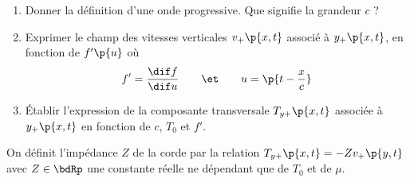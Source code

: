 \documentclass[a4paper,french,bookmarks]{article}
\begin{document}
    \begin{enumerate}
        \item Donner la définition d'une onde progressive. Que signifie la grandeur $c$ ?
        
        
        \item Exprimer le champ des vitesses verticales $v_+\p{x, t}$ associé à $y_+\p{x, t}$, en fonction de $f'\p{u}$ où
        \[ f' = \dfrac{\dif f}{\dif u} \qquad\et\qquad u = \p{t - \dfrac{x}{c}} \]
        
        
        \newpage
        
        \item Établir l'expression de la composante transversale $T_{y+}\p{x, t}$ associée à $y_+\p{x, t}$ en fonction de $c$, $T_0$ et $f'$.
        
    \end{enumerate}
    
    On définit l'impédance $Z$ de la corde par la relation $T_{y+}\p{x, t} = -Zv_+\p{y, t}$ avec $Z \in \bdRp$ une constante réelle ne dépendant que de $T_0$ et de $\mu$.
    
\end{document}
